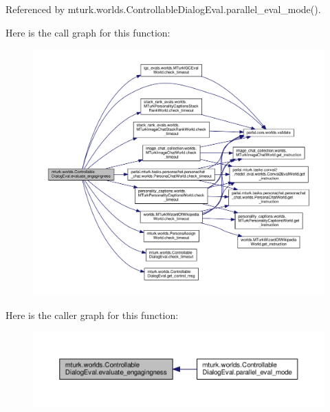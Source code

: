 Referenced by mturk.\+worlds.\+Controllable\+Dialog\+Eval.\+parallel\+\_\+eval\+\_\+mode().

Here is the call graph for this function\+:
\nopagebreak
\begin{figure}[H]
\begin{center}
\leavevmode
\includegraphics[width=350pt]{classmturk_1_1worlds_1_1ControllableDialogEval_a0cf75a08d4164e2b351a4ebf11e3bb53_cgraph}
\end{center}
\end{figure}
Here is the caller graph for this function\+:
\nopagebreak
\begin{figure}[H]
\begin{center}
\leavevmode
\includegraphics[width=350pt]{classmturk_1_1worlds_1_1ControllableDialogEval_a0cf75a08d4164e2b351a4ebf11e3bb53_icgraph}
\end{center}
\end{figure}
\mbox{\label{classmturk_1_1worlds_1_1ControllableDialogEval_a6208c058cb87f311f1362f597af72130}} 
